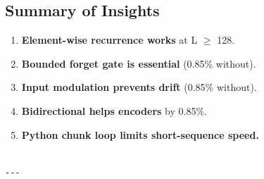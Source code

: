 \subsection{Summary of Insights}

\begin{enumerate}
\item \textbf{Element-wise recurrence works} at L $\ge$ 128.
\item \textbf{Bounded forget gate is essential} (0.85\% without).
\item \textbf{Input modulation prevents drift} (0.85\% without).
\item \textbf{Bidirectional helps encoders} by 0.85\%.
\item \textbf{Python chunk loop limits short-sequence speed.}
\end{enumerate}
\begin{lstlisting}

---
\end{lstlisting}